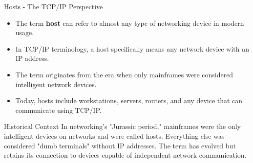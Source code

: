 \documentclass[aspectratio=169]{beamer}
\begin{document}
	\begin{frame}{Hosts - The TCP/IP Perspective}
		\begin{itemize}
			\item The term \textbf{host} can refer to almost any type of networking device in modern usage.
			\item In TCP/IP terminology, a host specifically means any network device with an IP address.
			\item The term originates from the era when only mainframes were considered intelligent network devices.
			\item Today, hosts include workstations, servers, routers, and any device that can communicate using TCP/IP.
		\end{itemize}
		
		\begin{alertblock}{Historical Context}
			In networking's "Jurassic period," mainframes were the only intelligent devices on networks and were called hosts. Everything else was considered "dumb terminals" without IP addresses. The term has evolved but retains its connection to devices capable of independent network communication.
		\end{alertblock}
	\end{frame}
	
\end{document}
